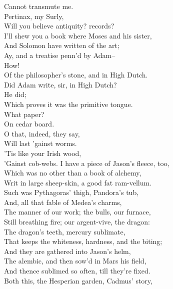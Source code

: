 \documentclass{memoir}
\begin{document}
\begin{drama*}
 Cannot transmute me.\\
\mammonspeaks {} Pertinax, my Surly,\\
 Will you believe antiquity? records?\\
 I'll shew you a book where Moses and his sister,\\
 And Solomon have written of the art;\\
 Ay, and a treatise penn'd by Adam--\\
\surlyspeaks {} How!\\
\mammonspeaks  Of the philosopher's stone, and in High Dutch.\\
\surlyspeaks  Did Adam write, sir, in High Dutch?\\
\mammonspeaks {} He did;\\
 Which proves it was the primitive tongue.\\
\surlyspeaks {} What paper?\\
\mammonspeaks  On cedar board.\\
\surlyspeaks {} O that, indeed, they say,\\
 Will last 'gainst worms.\\
\mammonspeaks {} 'Tis like your Irish wood,\\
 'Gainst cob-webs. I have a piece of Jason's fleece, too,\\
 Which was no other than a book of alchemy,\\
 Writ in large sheep-skin, a good fat ram-vellum.\\
 Such was Pythagoras' thigh, Pandora's tub,\\
 And, all that fable of Medea's charms,\\
 The manner of our work; the bulls, our furnace,\\
 Still breathing fire; our argent-vive, the dragon:\\
 The dragon's teeth, mercury sublimate,\\
 That keeps the whiteness, hardness, and the biting;\\
 And they are gathered into Jason's helm,\\
 The alembic, and then sow'd in Mars his field,\\
 And thence sublimed so often, till they're fixed.\\
 Both this, the Hesperian garden, Cadmus' story,\\

\end{drama*}
\end{document}
